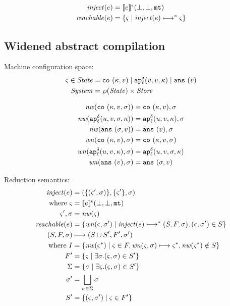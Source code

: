 \documentclass{llncs}
\newcommand{\inject}{\mathit{inject}}
\newcommand{\setof}[1]{\{ #1 \}}
\newcommand{\alt}{\mid}
\begin{document}
\begin{align*}
\inject(\mexp) &= \compile{\mexp}^{\mtcntr}(\bot,\bot,\kmt) \\
\reachable{\mexp} &= \setof{\mstate \mid \inject(\mexp) \machstep^* \mstate}
\end{align*}

\subsection{Widened abstract compilation}

Machine configuration space:
\begin{align*}
\mstate \in \State &= \co{\mkont, \mval} \alt
                     \ap[_\mlab^\mcntr]{\mval,\mval,\mkont} \alt
                     \ans{\mval} \\
\System &= \wp(\State) \times \Store
\end{align*}

\begin{align*}
\nw(\co{\mkont,\mval,\msto}) &= \co{\mkont, \mval}, \msto \\
\nw(\ap[^\mcntr_\mlab]{\mvalx{u},\mval,\msto,\mkont}) &= \ap[^\mcntr_\mlab]{\mvalx{u},\mval,\mkont}, \msto \\
\nw(\ans{\msto,\mval}) &= \ans{\mval}, \msto \\
\wn(\co{\mkont,\mval},\msto) &= \co{\mkont,\mval,\msto} \\
\wn(\ap[^\mcntr_\mlab]{\mvalx{u},\mval,\mkont},\msto) &= \ap[^\mcntr_\mlab]{\mvalx{u},\mval,\msto,\mkont} \\
\wn(\ans{\mval},\msto) &= \ans{\msto,\mval}
\end{align*}

Reduction semantics:
\begin{align*}
\inject(\mexp) &= (\setof{\ttuple{\mstate'}{\msto}},\setof{\mstate'},\msto) \\
 \text{ where } \mstate &= \compile{\mexp}^{\mtcntr}(\bot,\bot,\kmt) \\
                \mstate', \msto &= \nw(\mstate) \\
\reachable{\mexp} &= \setof{\wn(\mstate,\msto') \mid
                             \inject(\mexp) \machstep^* (S,F,\msto),
                             \ttuple{\mstate}{\msto'} \in S} \\
(S,F,\msto) &\machstep (S \cup S', F', \msto') \\
 \text{ where }
  I &= \setof{ \nw(\mstate^*) \mid \mstate \in F, \wn(\mstate,\msto) \machstep \mstate^*, \nw(\mstate^*)\notin S} \\
  F' &= \setof{\mstate \mid \exists \msto. \ttuple{\mstate}{\msto} \in S'} \\
  \Sigma &= \setof{\msto \mid \exists \mstate. \ttuple{\mstate}{\msto} \in S'} \\
  \msto' &= \bigsqcup\limits_{\msto\in\Sigma}{\msto} \\
  S' &= \setof{\ttuple{\mstate}{\msto'} \mid \mstate \in F'}
\end{align*}
\end{document}
